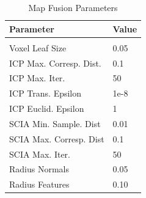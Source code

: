 \documentclass[letterpaper, oneside, 10pt]{report}
\begin{document}
\begin{table}[h!]
  \centering
  \caption{Map Fusion Parameters}
  \vspace{2mm}
  \begin{tabular}{l l}
    \hline \hline
    \vspace{-2mm}
    Parameter & \multicolumn{1}{l}{Value} \\ [1ex]
    \hline
    & \\
    Voxel Leaf Size & 0.05 \\
    ICP Max. Corresp. Dist. & 0.1 \\
    ICP Max. Iter. & 50 \\
    ICP Trans. Epsilon & 1e-8 \\
    ICP Euclid. Epsilon & 1 \\
    SCIA Min. Sample. Dist & 0.01 \\
    SCIA Max. Corresp. Dist & 0.1 \\
    SCIA Max. Iter. & 50 \\
    Radius Normals & 0.05 \\
    Radius Features & 0.10 \\
  \end{tabular}
  \label{tbl: map fusion param.}
\end{table}

\clearpage



\end{document}
